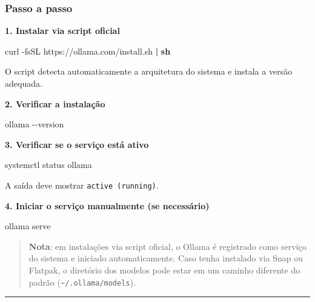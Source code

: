 \documentclass[
]{article}
\newenvironment{Shaded}{\begin{snugshade}}{\end{snugshade}}
\newcommand{\AttributeTok}[1]{\textcolor[rgb]{0.13,0.29,0.53}{#1}}
\newcommand{\ExtensionTok}[1]{#1}
\newcommand{\FunctionTok}[1]{\textcolor[rgb]{0.13,0.29,0.53}{\textbf{#1}}}
\newcommand{\KeywordTok}[1]{\textcolor[rgb]{0.13,0.29,0.53}{\textbf{#1}}}
\newcommand{\NormalTok}[1]{#1}
\begin{document}
\subsubsection{Passo a passo}\label{passo-a-passo-1}

\textbf{1. Instalar via script oficial}

\begin{Shaded}
\begin{Highlighting}[]
\ExtensionTok{curl} \AttributeTok{{-}fsSL}\NormalTok{ https://ollama.com/install.sh }\KeywordTok{|} \FunctionTok{sh}
\end{Highlighting}
\end{Shaded}

O script detecta automaticamente a arquitetura do sistema e instala a
versão adequada.

\textbf{2. Verificar a instalação}

\begin{Shaded}
\begin{Highlighting}[]
\ExtensionTok{ollama} \AttributeTok{{-}{-}version}
\end{Highlighting}
\end{Shaded}

\textbf{3. Verificar se o serviço está ativo}

\begin{Shaded}
\begin{Highlighting}[]
\ExtensionTok{systemctl}\NormalTok{ status ollama}
\end{Highlighting}
\end{Shaded}

A saída deve mostrar \texttt{active\ (running)}.

\textbf{4. Iniciar o serviço manualmente (se necessário)}

\begin{Shaded}
\begin{Highlighting}[]
\ExtensionTok{ollama}\NormalTok{ serve}
\end{Highlighting}
\end{Shaded}

\begin{quote}
\textbf{Nota}: em instalações via script oficial, o Ollama é registrado
como serviço do sistema e iniciado automaticamente. Caso tenha instalado
via Snap ou Flatpak, o diretório dos modelos pode estar em um caminho
diferente do padrão (\texttt{\textasciitilde{}/.ollama/models}).
\end{quote}

\begin{center}\rule{0.5\linewidth}{0.5pt}\end{center}
\end{document}
